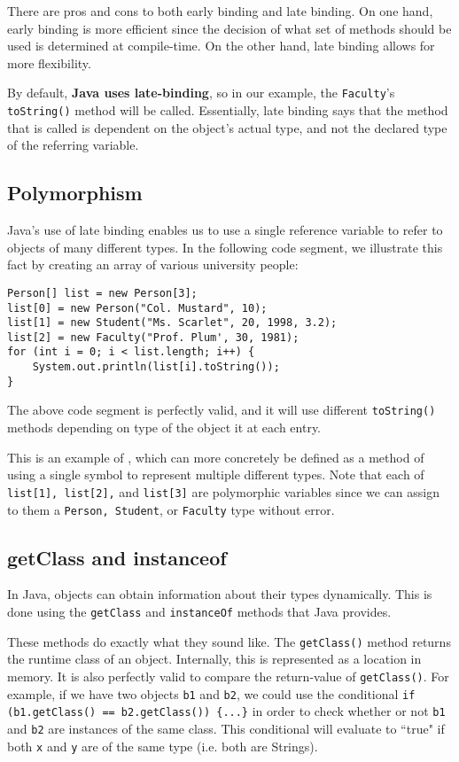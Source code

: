 There are pros and cons to both early binding and late binding. On one hand, early binding is more efficient since the decision of what set of methods should be used is determined at compile-time. On the other hand, late binding allows for more flexibility.

By default, \textbf{Java uses late-binding}, so in our example, the \verb!Faculty!'s \verb!toString()! method will be called. Essentially, late binding says that the method that is called is dependent on the object's actual type, and not the declared type of the referring variable.


\subsection{Polymorphism}

Java's use of late binding enables us to use a single reference variable to refer to objects of many different types. In the following code segment, we illustrate this fact by creating an array of various university people:


\begin{lstlisting}
Person[] list = new Person[3];
list[0] = new Person("Col. Mustard", 10);
list[1] = new Student("Ms. Scarlet", 20, 1998, 3.2);
list[2] = new Faculty("Prof. Plum', 30, 1981);
for (int i = 0; i < list.length; i++) {
    System.out.println(list[i].toString());
}
\end{lstlisting}

The above code segment is perfectly valid, and it will use different \verb!toString()! methods depending on type of the object it at each entry. 

This is an example of , which can more concretely be defined as a method of using a single symbol to represent multiple different types. Note that each of \verb!list[1], list[2],! and \verb!list[3]! are polymorphic variables since we can assign to them a \verb!Person, Student!, or \verb!Faculty! type without error.


\subsection{getClass and instanceof}

In Java, objects can obtain information about their types dynamically. This is done using the \verb!getClass! and \verb!instanceOf! methods that Java provides. 


These methods do exactly what they sound like. The \verb!getClass()! method returns the runtime class of an object. Internally, this is represented as a location in memory. It is also perfectly valid to compare the return-value of \verb!getClass()!. For example, if we have two objects \verb!b1! and \verb!b2!, we could use the conditional \verb!if (b1.getClass() == b2.getClass()) {...}! in order to check whether or not \verb!b1! and \verb!b2! are instances of the same class. This conditional will evaluate to ``true" if both \verb!x! and \verb!y! are of the same type (i.e. both are Strings).


